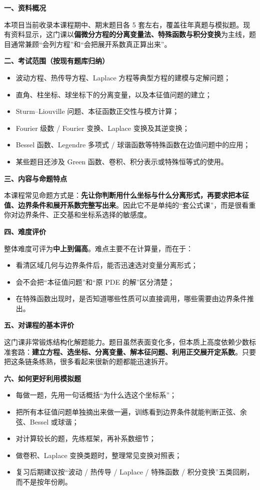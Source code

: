 ﻿

\textbf{一、资料概况}

本项目当前收录本课程期中、期末题目各 5 套左右，覆盖往年真题与模拟题。现有资料显示，这门课以\textbf{偏微分方程的分离变量法、特殊函数与积分变换}为主线，题目通常兼顾“会列方程”和“会把展开系数真正算出来”。

\textbf{二、考试范围（按现有题库归纳）}
\begin{itemize}[leftmargin=2em,itemsep=0.2em,topsep=0.2em]
  \item 波动方程、热传导方程、Laplace 方程等典型方程的建模与定解问题；
  \item 直角、柱坐标、球坐标下的分离变量，以及本征值问题的建立；
  \item Sturm--Liouville 问题、本征函数正交性与模方计算；
  \item Fourier 级数 / Fourier 变换、Laplace 变换及其逆变换；
  \item Bessel 函数、Legendre 多项式 / 球谐函数等特殊函数在边值问题中的应用；
  \item 某些题目还涉及 Green 函数、卷积、积分表示或特殊恒等式的使用。
\end{itemize}

\textbf{三、内容与命题特点}

本课程常见命题方式是：\textbf{先让你判断用什么坐标与什么分离形式，再要求把本征值、边界条件和展开系数完整写出来}。因此它不是单纯的“套公式课”，而是很看重你对边界条件、正交基和坐标系选择的敏感度。

\textbf{四、难度评价}

整体难度可评为\textbf{中上到偏高}。难点主要不在计算量，而在于：
\begin{itemize}[leftmargin=2em,itemsep=0.2em,topsep=0.2em]
  \item 看清区域几何与边界条件后，能否迅速选对变量分离形式；
  \item 会不会把“本征值问题”和“原 PDE 的解”区分清楚；
  \item 在特殊函数出现时，是否知道哪些性质可以直接调用，哪些需要由边界条件推出。
\end{itemize}

\textbf{五、对课程的基本评价}

这门课非常锻炼结构化解题能力。题目虽然表面变化多，但本质上高度依赖少数标准套路：\textbf{建立方程、选坐标、分离变量、解本征问题、利用正交展开定系数}。只要把这条链条练熟，很多看起来很新的题都能迅速拆开。

\textbf{六、如何更好利用模拟题}
\begin{itemize}[leftmargin=2em,itemsep=0.2em,topsep=0.2em]
  \item 每做一题，先用一句话概括“为什么选这个坐标系”；
  \item 把所有本征值问题单独摘出来做一遍，训练看到边界条件就能判断正弦、余弦、Bessel 或球谐；
  \item 对计算较长的题，先练框架，再补系数细节；
  \item 做卷积、Laplace 变换类题时，整理常见变换对照表；
  \item 复习后期建议按“波动 / 热传导 / Laplace / 特殊函数 / 积分变换”五类回刷，而不是按年份刷。
\end{itemize}

